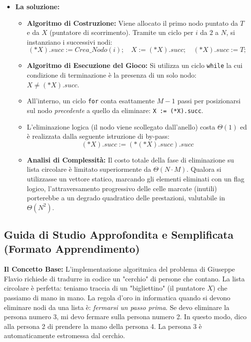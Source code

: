 \documentclass[a4paper, 11pt]{report}
\begin{document}
\begin{itemize}
    \item \textbf{La soluzione:}
    \begin{itemize}
        \item \textbf{Algoritmo di Costruzione:} Viene allocato il primo nodo puntato da $T$ e da $X$ (puntatore di scorrimento). Tramite un ciclo per $i$ da $2$ a $N$, si instanziano i successivi nodi:
        \begin{equation*}
        (*X).succ := Crea\_Nodo(i); \quad X := (*X).succ; \quad (*X).succ := T;
        \end{equation*}
        \item \textbf{Algoritmo di Esecuzione del Gioco:} Si utilizza un ciclo \texttt{while} la cui condizione di terminazione è la presenza di un solo nodo: $X \neq (*X).succ$.
        \item All'interno, un ciclo \texttt{for} conta esattamente $M-1$ passi per posizionarsi sul nodo \textit{precedente} a quello da eliminare: \texttt{X := (*X).succ}.
        \item L'eliminazione logica (il nodo viene scollegato dall'anello) costa $\Theta(1)$ ed è realizzata dalla seguente istruzione di by-pass:
        \begin{equation*}
        (*X).succ := (*(*X).succ).succ
        \end{equation*}
        \item \textbf{Analisi di Complessità:} Il costo totale della fase di eliminazione su lista circolare è limitato superiormente da $\Theta(N \cdot M)$. Qualora si utilizzasse un vettore statico, marcando gli elementi eliminati con un flag logico, l'attraversamento progressivo delle celle marcate (inutili) porterebbe a un degrado quadratico delle prestazioni, valutabile in $\Theta(N^2)$.
    \end{itemize}
\end{itemize}

\vspace{0.5cm}
\subsection*{Guida di Studio Approfondita e Semplificata (Formato Apprendimento)}



\textbf{Il Concetto Base:}
L'implementazione algoritmica del problema di Giuseppe Flavio richiede di tradurre in codice un "cerchio" di persone che contano. La lista circolare è perfetta: teniamo traccia di un "bigliettino" (il puntatore $X$) che passiamo di mano in mano. La regola d'oro in informatica quando si devono eliminare nodi da una lista è: \textit{fermarsi un passo prima}. Se devo eliminare la persona numero 3, mi devo fermare sulla persona numero 2. In questo modo, dico alla persona 2 di prendere la mano della persona 4. La persona 3 è automaticamente estromessa dal cerchio.
\end{document}
